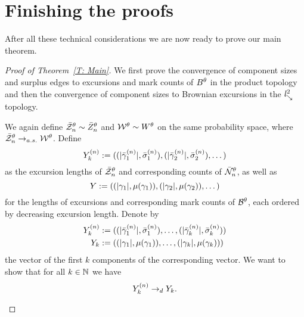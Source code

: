 \section{Finishing the proofs} \label{S: proofs}
After all these technical considerations we are now ready to prove our main theorem.

\begin{proof}[Proof of Theorem~\ref{T: Main}]
	We first prove the convergence of component sizes and surplus edges to excursions and mark counts of $B^{\theta}$ in the product topology
	and then the convergence of component sizes to Brownian excursions in the $\mathit{l}^2_{\searrow}$ topology.
	
	\begin{proofpart}
	We again define $\bar{\mathcal{Z}}^{\theta}_n \sim \bar{Z}^{\theta}_n$ and $\mathcal{W}^{\theta} \sim W^{\theta}$ on the same probability space,
	where $\bar{\mathcal{Z}}^{\theta}_n \rightarrow_{a.s.} \mathcal{W}^{\theta}$.
	Define
	\begin{equation} \label{E: def Yn}
		{Y}^{(n)}_k := ((|\bar{\gamma}^{(n)}_1|, \bar{\sigma}^{(n)}_1), (|\bar{\gamma}^{(n)}_2|, \bar{\sigma}^{(n)}_2), \dots)
	\end{equation}
	as the excursion lengths of $\bar{\mathcal{Z}}^{\theta}_n$ and corresponding counts of $\bar{\mathcal{N}}_n^{\theta}$,
	as well as
	\begin{equation} \label{E: def Y}
		{Y} := ((|\gamma_1|, \mu(\gamma_1)), (|\gamma_2|, \mu(\gamma_2)), \dots)
	\end{equation}
	for the lengths of excursions and corresponding mark counts of $\mathcal{B}^{\theta}$, each ordered by decreasing excursion length.
	Denote by 
	\begin{equation} \label{E: def Yk Ynk}
		\begin{aligned}
		{Y}^{(n)}_k &:= ((|\bar{\gamma}^{(n)}_1|, \bar{\sigma}^{(n)}_1), \dots, (|\bar{\gamma}^{(n)}_k|, \bar{\sigma}^{(n)}_k)) \\
		{Y}_k  &:= ((|\gamma_1|, \mu(\gamma_1)), \dots, (|\gamma_k|, \mu(\gamma_k)))
		\end{aligned}
	\end{equation}
	the vector of the first $k$ components of the corresponding vector.
	We want to show that for all $k \in \mathbb{N}$ we have
	\begin{equation}
		{Y}^{(n)}_k \rightarrow_d {Y}_k.
	\end{equation}
	

\end{proofpart}
\end{proof}
